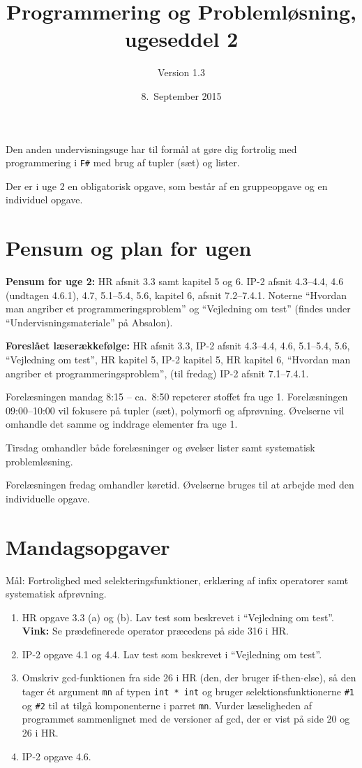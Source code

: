 \documentclass[a4paper,12pt]{article}
\title{Programmering og Problemløsning, ugeseddel 2}
\author{Version 1.3}%
\date{8.\ September 2015}
\newcommand{\fs}{\texttt{F\#} }
\begin{document}
\maketitle{}

Den anden undervisningsuge har til formål at gøre dig fortrolig med
programmering i \fs med brug af tupler (sæt) og lister.

Der er i uge 2 en obligatorisk opgave, som består af en
gruppeopgave og en individuel opgave.


\section{Pensum og plan for ugen}
\label{sec:pensum-og-plan}


\textbf{Pensum for uge 2:} HR afsnit 3.3 samt kapitel 5 og 6.  IP-2
afsnit 4.3--4.4, 4.6 (undtagen 4.6.1), 4.7, 5.1--5.4, 5.6, kapitel 6,
afsnit 7.2--7.4.1.  Noterne ``Hvordan man angriber et
programmeringsproblem'' og ``Vejledning om test'' (findes under
``Undervisningsmateriale'' på Absalon).

\textbf{Foreslået læserækkefølge:} HR afsnit 3.3, IP-2 afsnit
4.3--4.4, 4.6, 5.1--5.4, 5.6, ``Vejledning om test'', HR kapitel 5,
IP-2 kapitel 5, HR kapitel 6, ``Hvordan man angriber et
programmeringsproblem'', (til fredag) IP-2 afsnit 7.1--7.4.1.

Forelæsningen mandag 8:15 -- ca.\ 8:50 repeterer stoffet fra uge 1.
Forelæsningen 09:00--10:00 vil fokusere på tupler (sæt), polymorfi og
afprøvning.  Øvelserne vil omhandle det samme og inddrage elementer
fra uge 1.

Tirsdag omhandler både forelæsninger og øvelser lister samt
systematisk problemløsning.

Forelæsningen fredag omhandler køretid.  Øvelserne bruges til at
arbejde med den individuelle opgave.


\section{Mandagsopgaver}
\label{sec:mandagsopgaver}

Mål: Fortrolighed med selekteringsfunktioner, erklæring af infix
operatorer samt systematisk afprøvning.

\begin{enumerate}[{2}M1]
\item HR opgave 3.3 (a) og (b).  Lav test som beskrevet i ``Vejledning
  om test''. \textbf{Vink:} Se prædefinerede operator præcedens på side
  316 i HR.
\item IP-2 opgave 4.1 og 4.4.  Lav test som beskrevet i ``Vejledning
  om test''.
\item Omskriv gcd-funktionen fra side 26 i HR (den, der bruger
  if-then-else), så den tager ét argument \texttt{mn} af typen
  \texttt{int\,*\,int} og bruger selektionsfunktionerne \texttt{\#1}
  og \texttt{\#2} til at tilgå komponenterne i parret \texttt{mn}.
  Vurder læseligheden af programmet sammenlignet med de versioner af
  gcd, der er vist på side 20 og 26 i HR.
\item IP-2 opgave 4.6.
\end{enumerate}
\end{document}
